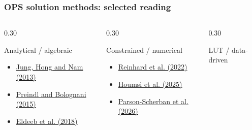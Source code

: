 \begin{frame}
    \frametitle{OPS solution methods: selected reading}

    \begin{columns}[T,totalwidth=0.98\textwidth]
        \begin{column}{0.30\textwidth}
            \begin{block}{Analytical / algebraic}
                \begin{minipage}[t][0.38\textheight][t]{\linewidth}
                    \begin{itemize}
                        \item \href{https://doi.org/10.1109/TPEL.2013.2245920}{Jung, Hong and Nam (2013)}
                        \item \href{https://doi.org/10.1109/TPEL.2014.2354299}{Preindl and Bolognani (2015)}\item \href{https://doi.org/10.1080/00207179.2017.1338359}{Eldeeb et al. (2018)}
                    \end{itemize}
                \end{minipage}
            \end{block}
        \end{column}\pause%
        \begin{column}{0.30\textwidth}
            \begin{block}{Constrained / numerical}
                \begin{minipage}[t][0.38\textheight][t]{\linewidth}
                    \begin{itemize}
                        \item \href{https://doi.org/10.1109/CCTA49430.2022.9965988}{Reinhard et al. (2022)}
                        \item \href{https://doi.org/10.1109/IAS62731.2025.11061499}{Houmsi et al. (2025)}
                        \item \href{https://arxiv.org/html/2604.17165}{Parson-Scherban et al. (2026)}
                    \end{itemize}
                \end{minipage}
            \end{block}
        \end{column}\pause%
        \begin{column}{0.30\textwidth}
            \begin{block}{LUT / data-driven}

\end{block}
\end{column}
\end{columns}
\end{frame}
